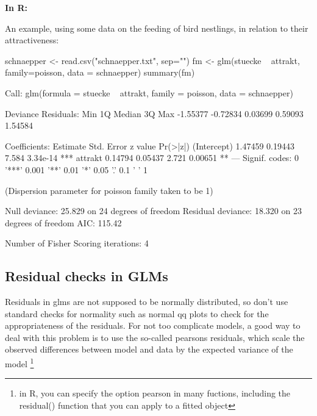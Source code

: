 \documentclass[a4paper,twoside]{tufte-book}\usepackage[]{graphicx}\usepackage[]{color}
\begin{document}
\vspace{1cm}
\begin{fullwidth}
\begin{mdframed}
    
\textbf{In R:} 

An example, using some data on the feeding of bird nestlings, in relation to their attractiveness:
\begin{Schunk}
\begin{Sinput}
schnaepper <- read.csv("schnaepper.txt", sep="")
fm <- glm(stuecke ~ attrakt, family=poisson, data = schnaepper)
summary(fm)
\end{Sinput}
\begin{Soutput}

Call:
glm(formula = stuecke ~ attrakt, family = poisson, data = schnaepper)

Deviance Residuals: 
     Min        1Q    Median        3Q       Max  
-1.55377  -0.72834   0.03699   0.59093   1.54584  

Coefficients:
            Estimate Std. Error z value Pr(>|z|)    
(Intercept)  1.47459    0.19443   7.584 3.34e-14 ***
attrakt      0.14794    0.05437   2.721  0.00651 ** 
---
Signif. codes:  0 '***' 0.001 '**' 0.01 '*' 0.05 '.' 0.1 ' ' 1

(Dispersion parameter for poisson family taken to be 1)

    Null deviance: 25.829  on 24  degrees of freedom
Residual deviance: 18.320  on 23  degrees of freedom
AIC: 115.42

Number of Fisher Scoring iterations: 4
\end{Soutput}
\end{Schunk}

\end{mdframed}
\end{fullwidth} 


\subsection{Residual checks in GLMs}

Residuals in glms are not supposed to be normally distributed, so don't use standard checks for normality such as normal qq plots to check for the appropriateness of the residuals. For not too complicate models, a good way to deal with this problem is to use the so-called pearsons residuals, which scale the observed differences between model and data by the expected variance of the model \footnote{in R, you can specify the option pearson in many fuctions, including the residual() function that you can apply to a fitted object}
\end{document}
